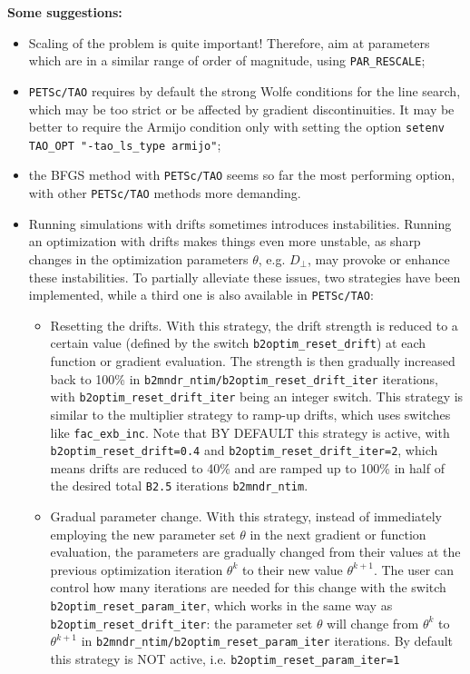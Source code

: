 \textbf{Some suggestions:}
\begin{itemize}
  \item Scaling of the problem is quite important! Therefore, aim at parameters which are in a similar range of order of magnitude, using {\tt PAR\_RESCALE};
  \item {\tt PETSc/TAO} requires by default the strong Wolfe conditions for the line search, which may be too strict or be affected by gradient discontinuities. It may be better to require the Armijo condition only with setting the option {\tt setenv TAO\_OPT "-tao\_ls\_type armijo"};
  \item the BFGS method with {\tt PETSc/TAO} seems so far the most performing option, with other {\tt PETSc/TAO} methods more demanding.
  \item Running simulations with drifts sometimes introduces instabilities. Running an optimization with drifts makes things even more unstable, as sharp changes in the optimization parameters $\theta$, e.g. $D_\perp$, may provoke or enhance these instabilities. To partially alleviate these issues, two strategies have been implemented, while a third one is also available in {\tt PETSc/TAO}:
  \begin{itemize}
  	\item Resetting the drifts. With this strategy, the drift strength is reduced to a certain value (defined by the switch {\tt b2optim\_reset\_drift}) at each function or gradient evaluation. The strength is then gradually increased back to 100\% in {\tt b2mndr\_ntim/b2optim\_reset\_drift\_iter} iterations, with {\tt b2optim\_reset\_drift\_iter} being an integer switch. This strategy is similar to the multiplier strategy to ramp-up drifts, which uses switches like {\tt fac\_exb\_inc}. Note that BY DEFAULT this strategy is active, with {\tt b2optim\_reset\_drift=0.4} and {\tt b2optim\_reset\_drift\_iter=2}, which means drifts are reduced to 40\% and are ramped up to 100\% in half of the desired total {\tt B2.5} iterations {\tt b2mndr\_ntim}.
  	\item Gradual parameter change. With this strategy, instead of immediately employing the new parameter set $\theta$ in the next gradient or function evaluation, the parameters are gradually changed from their values at the previous optimization iteration $\theta^k$ to their new value $\theta^{k+1}$. The user can control how many iterations are needed for this change with the switch {\tt b2optim\_reset\_param\_iter}, which works in the same way as {\tt b2optim\_reset\_drift\_iter}: the parameter set $\theta$ will change from $\theta^k$ to $\theta^{k+1}$ in {\tt b2mndr\_ntim/b2optim\_reset\_param\_iter} iterations. By default this strategy is NOT active, i.e. {\tt b2optim\_reset\_param\_iter=1}

\end{itemize}
\end{itemize}

